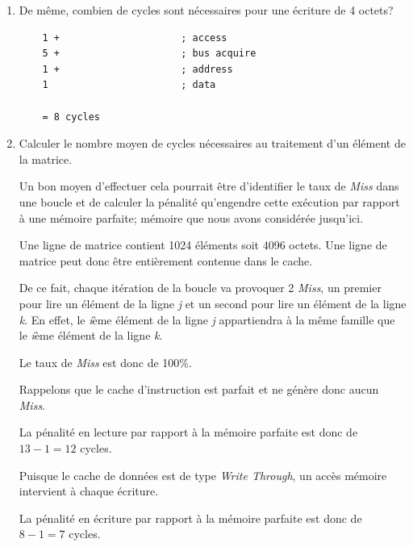 {\begin{enumerate}
\begin{correction}
    \end{correction}
  \item
    De m\^eme, combien de cycles sont n\'ecessaires pour une \'ecriture de
    4 octets?

    \begin{correction}

      \begin{verbatim}
	1 +                     ; access
	5 +                     ; bus acquire
	1 +                     ; address
	1                       ; data

	= 8 cycles
      \end{verbatim}

    \end{correction}
  \item
    Calculer le nombre moyen de cycles n\'ecessaires au traitement d'un
    \'el\'ement de la matrice.

    Un bon moyen d'effectuer cela pourrait \^etre d'identifier le taux de
    \textit{Miss} dans une boucle et de calculer la p\'enalit\'e
    qu'engendre cette ex\'ecution par rapport \`a une m\'emoire parfaite;
    m\'emoire que nous avons consid\'er\'ee jusqu'ici.

    \begin{correction}

      Une ligne de matrice contient 1024 \'el\'ements soit 4096 octets.
      Une ligne de matrice peut donc \^etre enti\`erement contenue dans le
      cache.

      De ce fait, chaque it\'eration de la boucle va provoquer 2 \textit{Miss},
      un premier pour lire un \'el\'ement de la ligne \textit{j} et un second
      pour lire un \'el\'ement de la ligne \textit{k}. En effet, le
      \textit{i}\`eme \'el\'ement de la ligne \textit{j} appartiendra \`a la
      m\^eme famille que le \textit{i}\`eme \'el\'ement de la ligne \textit{k}.

      Le taux de \textit{Miss} est donc de 100\%.

      Rappelons que le cache d'instruction est parfait et ne g\'en\`ere donc
      aucun \textit{Miss}.

      La p\'enalit\'e en lecture par rapport \`a la m\'emoire parfaite est
      donc de $13 - 1 = 12$ cycles.

      Puisque le cache de donn\'ees est de type \textit{Write Through}, un
      acc\`es m\'emoire intervient \`a chaque \'ecriture.

      La p\'enalit\'e en \'ecriture par rapport \`a la m\'emoire parfaite est
      donc de $8 - 1 = 7$ cycles.


\end{correction}
\end{enumerate}}

